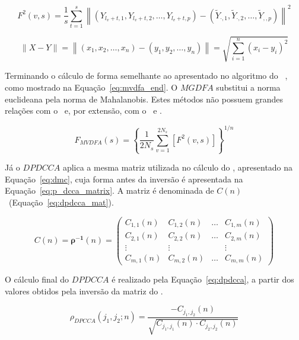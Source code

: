 \begin{equation}\label{eq:mvdfa}
  F^2(v, s)=\frac{1}{s} \sum_{t=1}^s\left\|\left(Y_{l_v+t, 1}, Y_{l_v+t, 2}, \ldots, Y_{l_v+t, p}\right)-\left(\tilde{Y}_{\cdot, 1}, \tilde{Y}_{\cdot, 2}, \ldots, \tilde{Y}_{,, p}\right)\right\|^2
  \end{equation}

\begin{equation}\label{eq:euclidean_norm}
    \|X-Y\|=\left\|\left(x_1, x_2, \ldots, x_n\right)-\left(y_1, y_2, \ldots, y_n\right)\right\|=\sqrt{\sum_{i=1}^n\left(x_i-y_i\right)^2}
\end{equation}

Terminando o cálculo de forma semelhante ao apresentado no algoritmo do \dfa~, como mostrado na Equação~\ref{eq:mvdfa_end}. O $MGDFA$ substitui a norma euclideana pela norma de Mahalanobis. Estes métodos não possuem grandes relações com o \dcca~e, por extensão, com o \pdcca~e \dmc.

\begin{equation}\label{eq:mvdfa_end}
    F_{M V D F A}(s)=\left\{\frac{1}{2 N_s} \sum_{v=1}^{2 N_s}\left[F^2(v, s)\right]\right\}^{1 / n}
\end{equation}

Já o $DPDCCA$ aplica a mesma matriz utilizada no cálculo do \dmc, apresentado na Equação~\ref{eq:dmc}, cuja forma antes da inversão é apresentada na Equação~\ref{eq:p_dcca_matrix}. A matriz é denominada de $C(n)$~(Equação~\ref{eq:dpdcca_mat}). 


\begin{equation}\label{eq:dpdcca_mat}
  C(n)=\boldsymbol{\rho}^{-\mathbf{1}}(n)=\left(\begin{matrix}
  C_{1,1}(n) & C_{1,2}(n) & \ldots & 
  C_{1, m}(n) \\
  C_{2,1}(n) & C_{2,2}(n) & \ldots & C_{2, m}(n) \\
  \vdots & \vdots & & \vdots \\
  C_{m, 1}(n) & C_{m, 2}(n) & \ldots & C_{m, m}(n)
  \end{matrix}\right)
\end{equation}

O cálculo final do $DPDCCA$ é realizado pela Equação~\ref{eq:dpdcca}, a partir dos valores obtidos pela inversão da matriz do \pdcca.

\begin{equation}\label{eq:dpdcca}
  \rho_{D P C C A}\left(j_1, j_2 ; n\right)=\frac{-C_{j_1, j_2}(n)}{\sqrt{C_{j_1, j_1}(n) \cdot C_{j_2, j_2}(n)}}
\end{equation}

